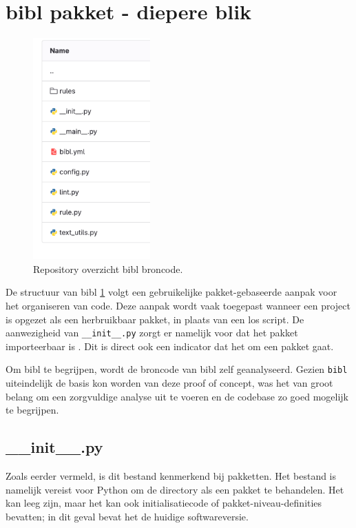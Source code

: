 \section{bibl pakket - diepere blik}
\label{sec:bibl-in-depth}
\begin{figure}[ht]
    \centering
    \includegraphics[width=0.4\textwidth]{./files/bibl_src.png}
    \caption[bibl repository - source code]{Repository overzicht bibl broncode.}
    \label{fig:bibl_src}
\end{figure}

De structuur van bibl \ref{fig:bibl_src} volgt een gebruikelijke pakket-gebaseerde aanpak voor het organiseren van code. Deze aanpak wordt vaak toegepast wanneer een project is opgezet als een herbruikbaar pakket, in plaats van een los script. De aanwezigheid van \texttt{\_\_init\_\_.py} zorgt er namelijk voor dat het pakket importeerbaar is \autocite{Loubser2021}. Dit is direct ook een indicator dat het om een pakket gaat.

Om bibl te begrijpen, wordt de broncode van bibl zelf geanalyseerd. Gezien \texttt{bibl} uiteindelijk de basis kon worden van deze proof of concept, was het van groot belang om een zorgvuldige analyse uit te voeren en de codebase zo goed mogelijk te begrijpen.

\subsection{\_\_init\_\_.py}
Zoals eerder vermeld, is dit bestand kenmerkend bij pakketten. Het bestand is namelijk vereist voor Python om de directory als een pakket te behandelen. Het kan leeg zijn, maar het kan ook initialisatiecode of pakket-niveau-definities bevatten; in dit geval bevat het de huidige softwareversie.

